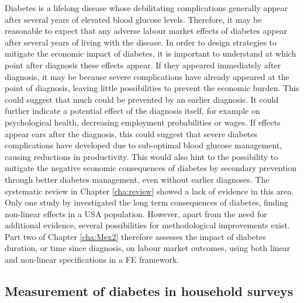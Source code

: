 Diabetes is a lifelong disease whose debilitating complications generally appear after several years of elevated blood glucose levels. Therefore, it may be reasonable to expect that any adverse labour market effects of diabetes appear after several years of living with the disease. In order to design strategies to mitigate the economic impact of diabetes, it is important to understand at which point after diagnosis these effects appear. If they appeared immediately after diagnosis, it may be because severe complications have already appeared at the point of diagnosis, leaving little possibilities to prevent the economic burden. This could suggest that much could be prevented by an earlier diagnosis. It could further indicate a potential effect of the diagnosis itself, for example on psychological health, decreasing employment probabilities or wages. If effects appear ears after the diagnosis, this could suggest that severe diabetes complications have developed due to sub-optimal blood glucose management, causing reductions in productivity. This would also hint to the possibility to mitigate the negative economic consequences of diabetes by secondary prevention through better diabetes management, even without earlier diagnoses. The systematic review in Chapter \ref{cha:review} showed a lack of evidence in this area. Only one study by \textcite{Minor2013} investigated the long term consequences of diabetes, finding non-linear effects in a USA population. However, apart from the need for additional evidence, several possibilities for methodological improvements exist. Part two of Chapter \ref{cha:Mex2} therefore assesses the impact of diabetes duration, or time since diagnosis, on labour market outcomes, using both linear and non-linear specifications in a \ac{FE} framework.   

\subsection{Measurement of diabetes in household surveys}


